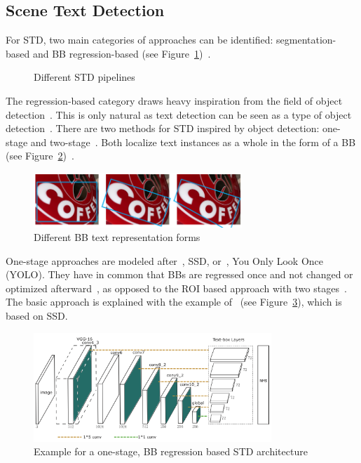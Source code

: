 \subsection{Scene Text Detection}
For \ac{STD}, two main categories of approaches can be identified: segmentation-based and \ac{BB}
regression-based (see
Figure~\ref{fig:STD-pipelines})~\citep{long_scene_2021,sheng_centripetaltext_2021,liu_accurate_2020}.
\begin{figure}[ht]
    \centering
    
    \caption{Different STD pipelines\label{fig:STD-pipelines}}
\end{figure}
The regression-based category draws heavy inspiration from the field of object
detection~\citep{long_scene_2021,liu_accurate_2020}.
This is only natural as text detection can be seen as a type of object
detection~\citep{liu_accurate_2020,long_scene_2021}.
There are two methods for \ac{STD} inspired by object detection: one-stage and
two-stage~\citep{long_scene_2021}.
Both localize text instances as a whole in the form of a
\ac{BB} (see Figure~\ref{fig:STD-BB})~\citep{long_scene_2021,sheng_centripetaltext_2021}.
\begin{figure}[h]
    \centering
    \includegraphics[width=0.7\textwidth]{img/STD-representation-BB-Liao-Textsnake-2018.png}
    \caption[Different BB text representation forms]{%
        Different BB text representation forms~\citep{ferrari_textsnake_2018}\label{fig:STD-BB}
    }
\end{figure}
One-stage approaches are modeled after~\cite{liu_ssd_2016}, \ac{SSD}, or~\cite{redmon_you_2016},
You Only Look Once (YOLO).
They have in common that \acp{BB} are regressed once and not changed or optimized
afterward~\citep{redmon_you_2016,liu_ssd_2016}, as opposed to the \ac{ROI} based approach with two
stages~\citep{girshick_rich_2014}.
The basic approach is explained with the example of~\cite{liao_textboxes_2017} (see
Figure~\ref{fig:STD-segfree-ssd}), which is based on \ac{SSD}.
\begin{figure}[ht]
    \centering
    \includegraphics[width=0.8\textwidth]{img/STD-seg-free-Liao-TextBoxes-2017.png}
    \caption[One-stage, BB regression based STD architecture]{%
        Example for a one-stage, BB regression based STD
        architecture~\citep{liao_textboxes_2017}\label{fig:STD-segfree-ssd}
    }
\end{figure}
